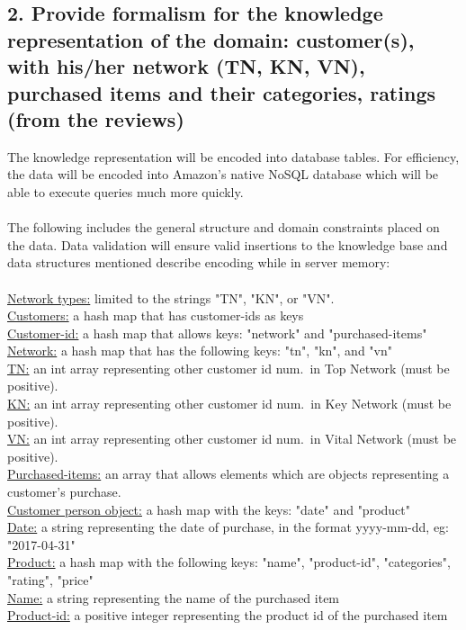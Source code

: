 \documentclass[12pt,a4paper]{article}
\begin{document}
	\subsection*{2. Provide formalism for the knowledge representation of the domain: customer(s), with his/her network (TN, KN, VN), purchased items and their categories, ratings (from the reviews)}
		The knowledge representation will be encoded into database tables. For efficiency, the data will be encoded into Amazon's native NoSQL database which will be able to execute queries much more quickly. 
		\\\\
		The following includes the general structure and domain constraints placed on the data. Data validation will ensure valid insertions to the knowledge base and data structures mentioned describe encoding while in server memory: 
		\\\\
		\underline{Network types:} limited to the strings "TN", "KN", or "VN". \\
		\underline{Customers:} a hash map that has customer-ids as keys\\
		\underline{Customer-id:} a hash map that allows keys: "network" and "purchased-items"\\
		\underline{Network:} a hash map that has the following keys: "tn", "kn", and "vn"\\
		\underline{TN:} an int array representing other customer id num.\ in Top Network (must be positive).\\ 
		\underline{KN:} an int array representing other customer id num.\ in Key Network (must be positive). \\
		\underline{VN:} an int array representing other customer id num.\ in Vital Network (must be positive).\\ 
		\underline{Purchased-items:} an array that allows elements which are objects representing a customer's purchase.\\
		\underline{Customer person object:} a hash map with the keys: "date" and "product"\\
		\underline{Date:} a string representing the date of purchase, in the format yyyy-mm-dd, eg: "2017-04-31"\\
		\underline{Product:} a hash map with the following keys: "name", "product-id", "categories", "rating", "price"\\
		\underline{Name:}  a string representing the name of the purchased item \\
		\underline{Product-id:} a positive integer representing the product id of the purchased item\\
\end{document}
